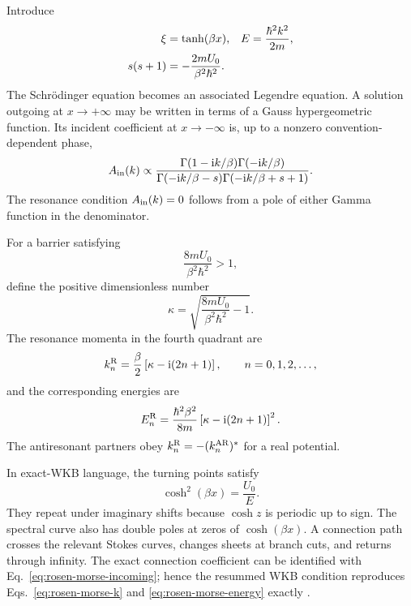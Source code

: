 Introduce
\begin{align}
  \xi&=\tanh(\beta x),
  &E&=\frac{\hbar^2k^2}{2m},
  \notag\\
  s(s+1)&=-\frac{2mU_0}{\beta^2\hbar^2} .
  \label{eq:rosen-morse-parameters}
\end{align}
The Schr\"odinger equation becomes an associated Legendre equation.  A
solution outgoing at $x\to+\infty$ may be written in terms of a Gauss
hypergeometric function.  Its incident coefficient at $x\to-\infty$ is,
up to a nonzero convention-dependent phase,
\begin{equation}
  A_{\mathrm{in}}(k)
  \propto
  \frac{\Gamma(1-\mathrm{i} k/\beta)
  \Gamma(-\mathrm{i} k/\beta)}
  {\Gamma(-\mathrm{i} k/\beta-s)
  \Gamma(-\mathrm{i} k/\beta+s+1)} .
  \label{eq:rosen-morse-incoming}
\end{equation}
The resonance condition $A_{\mathrm{in}}(k)=0$ follows from a pole of either
Gamma function in the denominator.

For a barrier satisfying
\begin{equation}
  \frac{8mU_0}{\beta^2\hbar^2}>1,
  \label{eq:strong-barrier}
\end{equation}
define the positive dimensionless number
\begin{equation}
  \kappa
  =\sqrt{\frac{8mU_0}{\beta^2\hbar^2}-1} .
  \label{eq:kappa-rosen-morse}
\end{equation}
The resonance momenta in the fourth quadrant are
\begin{equation}
  k_n^{\mathrm R}
  =\frac{\beta}{2}
  \left[\kappa-\mathrm{i}(2n+1)\right],
  \qquad n=0,1,2,\ldots ,
  \label{eq:rosen-morse-k}
\end{equation}
and the corresponding energies are
\begin{equation}
  E_n^{\mathrm R}
  =\frac{\hbar^2\beta^2}{8m}
  \left[\kappa-\mathrm{i}(2n+1)\right]^2 .
  \label{eq:rosen-morse-energy}
\end{equation}
The antiresonant partners obey
$k_n^{\mathrm{R}}=-(k_n^{\mathrm{AR}})^*$ for a real potential.

In exact-WKB language, the turning points satisfy
\begin{equation}
  \cosh^2(\beta x)=\frac{U_0}{E} .
  \label{eq:rosen-morse-turning-points}
\end{equation}
They repeat under imaginary shifts because $\cosh z$ is periodic up to sign.
The spectral curve also has double poles at zeros of $\cosh(\beta x)$.  A
connection path crosses the relevant Stokes curves, changes sheets at branch
cuts, and returns through infinity.  The exact connection coefficient can be
identified with Eq.~\eqref{eq:rosen-morse-incoming}; hence the resummed WKB
condition reproduces Eqs.~\eqref{eq:rosen-morse-k} and
\eqref{eq:rosen-morse-energy} exactly
\cite{Morikawa:2025grx,Morikawa:2025xjq}.

